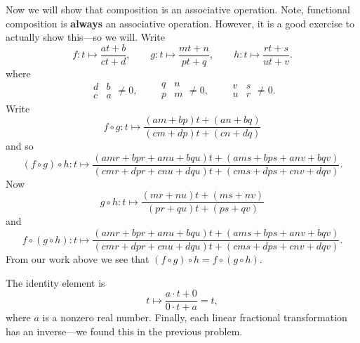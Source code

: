 \begin{exercise}
\begin{solution}
{Now we will show that composition is an associative operation. Note,
functional composition is \textbf{always} an associative
operation. However, it is a good exercise to actually show this---so
we will. Write
\[
f:t \mapsto\frac{at+b}{ct+d},\qquad
g:t \mapsto\frac{mt+n}{pt+q},\qquad
h:t \mapsto\frac{rt+s}{ut+v}.
\]
where
\[
\begin{array}{|cc|}
d & b\\
c& a
\end{array} \ne 0,\qquad
\begin{array}{|cc|}
q & n\\
p& m
\end{array} \ne 0,\qquad
\begin{array}{|cc|}
v & s\\
u& r
\end{array} \ne 0.
\]
Write
\[
f\circ g : t \mapsto \frac{(am+bp)t+(an+bq)}{(cm+dp)t + (cn+dq)}
\]
and so
\[
(f\circ g) \circ h : t\mapsto \frac{(amr+bpr+anu+bqu)t+(ams+bps+anv+bqv)}{(cmr+dpr+cnu+dqu)t+(cms+dps+cnv+dqv)}. 
\]
Now
\[
g\circ h : t \mapsto \frac{(mr+nu)t+(ms+nv)}{(pr+qu)t + (ps+qv)}
\]
and
\[
f\circ (g \circ h) : t\mapsto \frac{(amr+bpr+anu+bqu)t+(ams+bps+anv+bqv)}{(cmr+dpr+cnu+dqu)t+(cms+dps+cnv+dqv)}. 
\]
From our work above we see that $(f\circ g)\circ h = f\circ(g\circ
 h)$.  

The identity element is
\[
t\mapsto \frac{a\cdot t + 0}{0\cdot t + a} = t,
\]
where $a$ is a nonzero real number.  Finally, each linear fractional
transformation has an inverse---we found this in the previous problem.
}
\end{solution}
\end{exercise}




